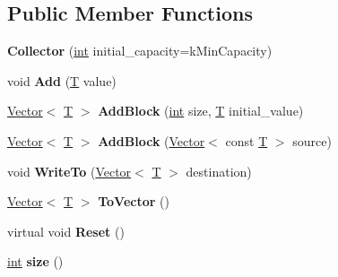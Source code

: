 \subsection*{Public Member Functions}
\begin{DoxyCompactItemize}
\item 
\mbox{\label{classv8_1_1internal_1_1Collector_a3838b4dcbb90f36d647f824ad5fa0eb1}} 
{\bfseries Collector} (\mbox{\hyperlink{classint}{int}} initial\+\_\+capacity=k\+Min\+Capacity)
\item 
\mbox{\label{classv8_1_1internal_1_1Collector_acaac9bfd2e8781d32027df2c9f93e1b5}} 
void {\bfseries Add} (\mbox{\hyperlink{classv8_1_1internal_1_1torque_1_1T}{T}} value)
\item 
\mbox{\label{classv8_1_1internal_1_1Collector_a3470f0a3600e437fbdee51a73300b19d}} 
\mbox{\hyperlink{classv8_1_1internal_1_1Vector}{Vector}}$<$ \mbox{\hyperlink{classv8_1_1internal_1_1torque_1_1T}{T}} $>$ {\bfseries Add\+Block} (\mbox{\hyperlink{classint}{int}} size, \mbox{\hyperlink{classv8_1_1internal_1_1torque_1_1T}{T}} initial\+\_\+value)
\item 
\mbox{\label{classv8_1_1internal_1_1Collector_aa2745d1f45025ce3450802841ad7c353}} 
\mbox{\hyperlink{classv8_1_1internal_1_1Vector}{Vector}}$<$ \mbox{\hyperlink{classv8_1_1internal_1_1torque_1_1T}{T}} $>$ {\bfseries Add\+Block} (\mbox{\hyperlink{classv8_1_1internal_1_1Vector}{Vector}}$<$ const \mbox{\hyperlink{classv8_1_1internal_1_1torque_1_1T}{T}} $>$ source)
\item 
\mbox{\label{classv8_1_1internal_1_1Collector_a2f49f357b0782e14e3e2435123768322}} 
void {\bfseries Write\+To} (\mbox{\hyperlink{classv8_1_1internal_1_1Vector}{Vector}}$<$ \mbox{\hyperlink{classv8_1_1internal_1_1torque_1_1T}{T}} $>$ destination)
\item 
\mbox{\label{classv8_1_1internal_1_1Collector_ac5d8e65cff7970930aa9d0444057d31f}} 
\mbox{\hyperlink{classv8_1_1internal_1_1Vector}{Vector}}$<$ \mbox{\hyperlink{classv8_1_1internal_1_1torque_1_1T}{T}} $>$ {\bfseries To\+Vector} ()
\item 
\mbox{\label{classv8_1_1internal_1_1Collector_a9c9394c1dd8e9e139c5dc8a84008078c}} 
virtual void {\bfseries Reset} ()
\item 
\mbox{\label{classv8_1_1internal_1_1Collector_a63d78fce1c0b6ee317f13bb07f8fdfcc}} 
\mbox{\hyperlink{classint}{int}} {\bfseries size} ()
\end{DoxyCompactItemize}
